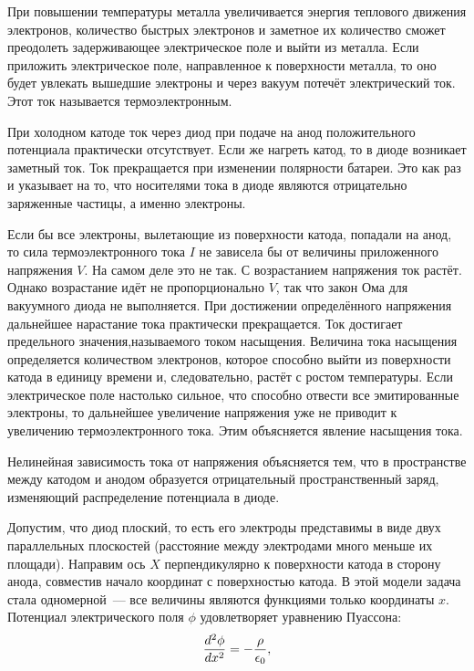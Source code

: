 При повышении температуры металла увеличивается энергия теплового движения электронов, количество быстрых электронов и заметное их количество сможет преодолеть задерживающее электрическое поле и выйти из металла. Если приложить
электрическое поле, направленное к поверхности металла, то оно будет увлекать вышедшие электроны и через вакуум потечёт электрический ток. Этот ток называется {\textsf{термоэлектронным}}.

При холодном катоде ток через диод при подаче на анод положительного потенциала практически отсутствует. Если же нагреть катод, то в диоде возникает заметный ток. Ток прекращается при изменении полярности батареи. Это как раз и указывает на то, что носителями тока в диоде являются отрицательно заряженные частицы, а именно электроны.

Если бы все электроны, вылетающие из поверхности катода, попадали на анод, то сила термоэлектронного тока $I$ не
зависела бы от величины приложенного напряжения $V$. На самом деле это не так. С возрастанием напряжения ток растёт.
Однако возрастание идёт не пропорционально $V$, так что закон Ома для вакуумного диода не выполняется. При достижении определённого напряжения дальнейшее нарастание тока практически прекращается. Ток достигает предельного значения,называемого током насыщения. Величина тока насыщения определяется количеством электронов, которое способно выйти из поверхности катода в единицу времени и, следовательно, растёт с ростом температуры. Если электрическое поле настолько сильное, что способно отвести все эмитированные электроны, то дальнейшее увеличение напряжения уже не приводит к увеличению термоэлектронного тока. Этим объясняется явление насыщения тока.

Нелинейная зависимость тока от напряжения объясняется тем, что в пространстве между катодом и анодом образуется
отрицательный пространственный заряд, изменяющий распределение потенциала в диоде.

Допустим, что диод плоский, то есть его электроды представимы в виде двух параллельных плоскостей (расстояние между
электродами много меньше их площади). Направим ось $X$ перпендикулярно к поверхности катода в сторону анода, совместив начало координат с поверхностью катода. В этой модели задача стала одномерной~--- все величины являются функциями только координаты $x$. Потенциал электрического поля $\phi$ удовлетворяет уравнению Пуассона:
\begin{equation}
	\eqmark{01g}
	\frac{d^2\phi}{dx^2}=-\frac{\rho}{\epsilon_0},
\end{equation}

